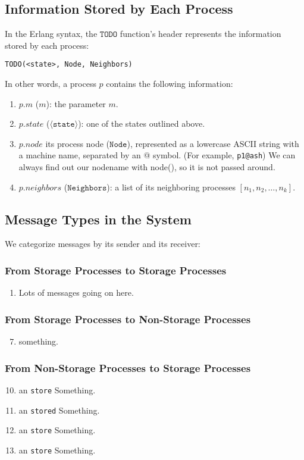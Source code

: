 \documentclass[11pt]{article}
\begin{document}
\subsection{Information Stored by Each Process}
In the Erlang syntax, the $\texttt{TODO}$ function's header represents
the information stored by each process:
\begin{lstlisting}
TODO(<state>, Node, Neighbors)
\end{lstlisting}
In other words, a process $p$ contains the following information:
\begin{enumerate}
\item $p.m$ ($m$): the parameter $m$.
\item $p.state$ ($\langle\texttt{state}\rangle$): one of the \numStates states outlined above.
\item $p.node$ its process node ($\texttt{Node}$), represented as a lowercase ASCII string with a machine name, separated by an @ symbol. (For example, \texttt{p1@ash}) We can always find out our nodename with node(), so it is not passed around.
\item $p.neighbors$ ($\texttt{Neighbors}$): a list of its neighboring processes $[n_1, n_2, \ldots, n_k]$.
\end{enumerate}

\subsection{Message Types in the System}
We categorize messages by its sender and its receiver:
\subsubsection{From Storage Processes to Storage Processes}
\begin{enumerate}[M1]
\item \label{M:fork} Lots of messages going on here.
\end{enumerate}

\subsubsection{From Storage Processes to Non-Storage Processes}
\begin{enumerate}[M1]
\setcounter{enumi}{6}
\item \label{M:become_hungry} something.
\end{enumerate}

\subsubsection{From Non-Storage Processes to Storage Processes}
\begin{enumerate}[M1]
\setcounter{enumi}{9}
\item an \texttt{store} Something.
\item an \texttt{stored} Something.
\item an \texttt{store} Something.
\item an \texttt{store} Something.
\end{enumerate}
\end{document}
